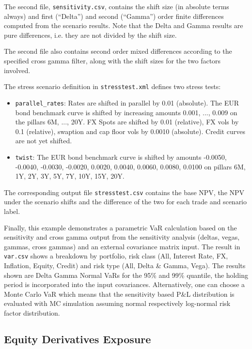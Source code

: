 \documentclass[12pt, a4paper]{article}
\begin{document}
The second file, {\tt sensitivity.csv}, contains the shift size (in absolute terms always) and first (``Delta'') and second
(``Gamma'') order finite differences computed from the scenario results. Note that the Delta and Gamma results are pure
differences, i.e. they are not divided by the shift size.

The second file also contains second order mixed differences according to the specified cross gamma filter, along with the shift sizes for the two factors involved.

The stress scenario definition in {\tt stresstest.xml} defines two stress tests:

\begin{itemize}
\item {\tt parallel\_rates}: Rates are shifted in parallel by 0.01 (absolute). The EUR bond benchmark curve is shifted by
  increasing amounts 0.001, ..., 0.009 on the pillars 6M, ..., 20Y. FX Spots are shifted by 0.01 (relative), FX vols by
  0.1 (relative), swaption and cap floor vols by 0.0010 (absolute).
  Credit curves are not yet shifted.
\item {\tt twist}: The EUR bond benchmark curve is shifted by amounts -0.0050, -0.0040, -0.0030, -0.0020, 0.0020,
  0.0040, 0.0060, 0.0080, 0.0100 on pillars 6M, 1Y, 2Y, 3Y, 5Y, 7Y, 10Y, 15Y, 20Y.
\end{itemize}

The corresponding output file {\tt stresstest.csv} contains the base NPV, the NPV under the scenario shifts and the
difference of the two for each trade and scenario label.

\medskip
Finally, this example demonstrates a parametric VaR calculation based on the sensitivity and cross gamma output from the sensitivity analysis (deltas, vegas, gammas, cross gammas) and an external covariance matrix input. The result in {\tt var.csv} shows a breakdown by portfolio, risk class (All, Interest Rate, FX, Inflation, Equity, Credit) and risk type (All, Delta \& Gamma, Vega). The results shown are Delta Gamma Normal VaRs for the 95\% and 99\% quantile, the holding period is incorporated into the input covariances. Alternatively, one can choose a Monte Carlo VaR which means that the sensitivity based P\&L distribution is evaluated with MC simulation assuming normal respectively log-normal risk factor distribution. 
 
\subsection{Equity Derivatives Exposure}\label{ex:equityderivatives}
\end{document}
